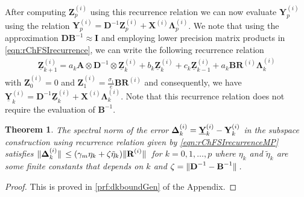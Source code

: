 \documentclass[preprint,3p,number,sort&compress]{elsarticle}
\newtheorem{theorem}{Theorem}[section]
\newcommand{\bA}{\textbf{A}}
\newcommand{\bB}{\textbf{B}}
\newcommand{\bD}{\textbf{D}}
\newcommand{\bI}{\textbf{I}}
\newcommand{\bX}{\textbf{X}}
\newcommand{\bY}{\textbf{Y}}
\newcommand{\bZ}{\textbf{Z}}
\newcommand{\bR}{\textbf{R}}
\newcommand{\bDelta}{\boldsymbol{\Delta}}
\newcommand{\bLam}{\boldsymbol{\Lambda}}
\DeclarePairedDelimiter\norm{\lVert}{\rVert\,}%
\begin{document}
After computing $\bZ_p^{(i)}$ using this recurrence relation we can now evaluate $\bY_p^{(i)}$ using the relation $\bY_p^{(i)}=\bD^{-1}\bZ_p^{(i)}+\bX^{(i)}\bLam_p^{(i)}$. We note that using the approximation $\bD\bB^{-1}\approx\bI$ and employing lower precision matrix products in \cref{eqn:rChFSIrecurrence}, we can write the following recurrence relation
\begin{align}
 \underline{\bZ}_{k+1}^{(i)}=a_k{\bA\otimes\bD^{-1}\otimes\underline{\bZ}_k^{(i)}}+b_k\underline{\bZ}_k^{(i)}+c_k\underline{\bZ}_{k-1}^{(i)}+a_k\bB\bR^{(i)}\bLam_k^{(i)}\label{eqn:rChFSIrecurrenceMP}
\end{align}
with $\bZ_0^{(i)}=0$ and $\bZ_1^{(i)}=\frac{\sigma_{1}}{e}\bB\bR^{(i)}$ and consequently, we have $\underline{\bY}_k^{(i)}=\bD^{-1}\underline{\bZ}_k^{(i)}+\bX^{(i)}\bLam_k^{(i)}$. Note that this recurrence relation does not require the evaluation of $\bB^{-1}$.

\begin{theorem}
The spectral norm of the error $\normalfont\bDelta_k^{(i)}=\underline{\bY}_k^{(i)}-\bY_k^{(i)}$ in the subspace construction using recurrence relation given by \cref{eqn:rChFSIrecurrenceMP} satisfies $\normalfont\norm{\bDelta_k^{(i)}}\leq(\gamma_m\eta_k+\zeta\tilde{\eta}_k)\norm{\bR^{(i)}}$ for $k=0,1,\dots,p$ where $\eta_k$ and $\tilde{\eta}_k$ are some finite constants that depends on $k$ and $\normalfont\zeta=\norm{\bD^{-1}-\bB^{-1}}$.\label{thm:dkboundGen}
\end{theorem}
\begin{proof}
This is proved in \cref{prf:dkboundGen} of the Appendix.
\end{proof}
\end{document}

